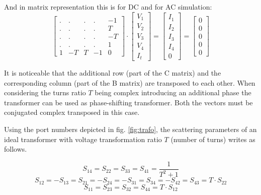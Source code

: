 And in matrix representation this is for DC and for AC simulation:
\begin{equation}
\begin{bmatrix}
.&.&.&.& -1\\
.&.&.&.& T\\
.&.&.&.& -T\\
.&.&.&.& 1\\
1 & -T & T & -1 & 0
\end{bmatrix}
\cdot
\begin{bmatrix}
V_{1}\\
V_{2}\\
V_{3}\\
V_{4}\\
I_{t}
\end{bmatrix}
=
\begin{bmatrix}
I_{1}\\
I_{2}\\
I_{3}\\
I_{4}\\
0
\end{bmatrix}
=
\begin{bmatrix}
0\\
0\\
0\\
0\\
0
\end{bmatrix}
\end{equation}

It is noticeable that the additional row (part of the C matrix) and the
corresponding column (part of the B matrix) are transposed to each
other.  When considering the turns ratio $T$ being complex introducing
an additional phase the transformer can be used as phase-shifting
transformer.  Both the vectors must be conjugated complex transposed
in this case.

\addvspace{12pt}

Using the port numbers depicted in fig. \ref{fig:trafo}, the
scattering parameters of an ideal transformer with voltage
transformation ratio $T$ (number of turns) writes as follows.

\begin{equation}
S_{14} = S_{22} = S_{33} = S_{41} = \frac{1}{T^2+1}
\end{equation}
\begin{equation}
S_{12} = -S_{13} = S_{21} = -S_{24} = -S_{31} = S_{34} = -S_{42} = S_{43} = T\cdot S_{22}
\end{equation}
\begin{equation}
S_{11} = S_{23} = S_{32} = S_{44} = T\cdot S_{12}
\end{equation}

